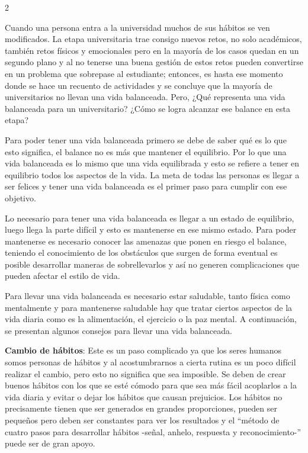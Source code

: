 \documentclass[12pt,spanish,Letterpaper,openany]{book}
\begin{document}
\begin {multicols}{2}

Cuando una persona entra a la universidad muchos de sus hábitos se ven modificados. La etapa universitaria trae consigo nuevos retos, no solo académicos, también retos físicos y emocionales pero en la mayoría de los casos quedan en un segundo plano y al no tenerse una buena gestión de estos retos pueden convertirse en un problema que sobrepase al estudiante; entonces, es hasta ese momento donde se hace un recuento de actividades y se concluye que la mayoría de universitarios no llevan una vida balanceada. Pero, ¿Qué representa una vida balanceada para un universitario? ¿Cómo se logra alcanzar ese balance en esta etapa?

Para poder tener una vida balanceada primero se debe de saber qué es lo que esto significa, el balance no es más que mantener el equilibrio. Por lo que una vida balanceada es lo mismo que una vida equilibrada y esto se refiere a tener en equilibrio todos los aspectos de la vida. La meta de todas las personas es llegar a ser felices y tener una vida balanceada es el primer paso para cumplir con ese objetivo.

Lo necesario para tener una vida balanceada es llegar a un estado de equilibrio, luego llega la parte difícil y esto es mantenerse en ese mismo estado. Para poder mantenerse es necesario conocer las amenazas que ponen en riesgo el balance, teniendo el conocimiento de los obstáculos que surgen de forma eventual es posible desarrollar maneras de sobrellevarlos y así no generen complicaciones que pueden afectar el estilo de vida.

Para llevar una vida balanceada es necesario estar saludable, tanto física como mentalmente y para mantenerse saludable hay que tratar ciertos aspectos de la vida diaria como es la alimentación, el ejercicio o la paz mental. A continuación, se presentan algunos consejos para llevar una vida balanceada.

\textbf{Cambio de hábitos}: Este es un paso complicado ya que los seres humanos somos personas de hábitos y al acostumbrarnos a cierta rutina es un poco difícil realizar el cambio, pero esto no significa que sea imposible. Se deben de crear buenos hábitos con los que se esté cómodo para que sea más fácil acoplarlos a la vida diaria y evitar o dejar los hábitos que causan prejuicios. Los hábitos no precisamente tienen que ser generados en grandes proporciones, pueden ser pequeños pero deben ser constantes para ver los resultados y el ``método de cuatro pasos para desarrollar hábitos -señal, anhelo, respuesta y reconocimiento-'' puede ser de gran apoyo.


\end{multicols}
\end{document}
